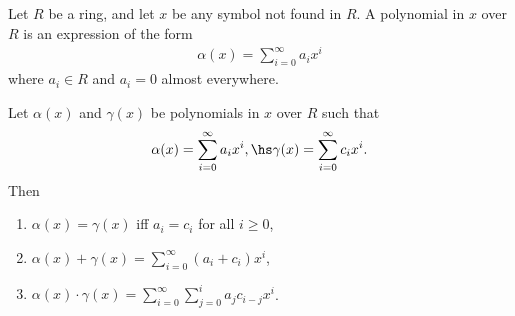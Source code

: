 \documentclass{article}
\begin{document}
\begin{definition}
    Let $R$ be a ring, and let $x$ be any symbol not found in $R$. A polynomial in $x$ over $R$ 
    is an expression of the form 
    \begin{align*}
        \alpha(x)=\sum_{i=0}^\infty a_ix^i
    \end{align*}
    where $a_i\in R$ and $a_i=0$ almost everywhere.
\end{definition}

\begin{definition}
    Let $\alpha(x)$ and $\gamma(x)$ be polynomials in $x$ over $R$ such that 
    \begin{align*}
        \alpha(x)=\sum_{i=0}^\infty a_ix^i,\hs
        \gamma(x)=\sum_{i=0}^\infty c_ix^i.
    \end{align*}
    Then \begin{enumerate}
        \item $\alpha(x)=\gamma(x)$ iff $a_i=c_i$ for all $i\geq 0$,
        \item $\alpha(x)+\gamma(x)=\sum_{i=0}^\infty (a_i+c_i)x^i$,
        \item $\alpha(x)\cdot\gamma(x)=\sum_{i=0}^\infty \sum_{j=0}^i a_jc_{i-j}x^i$.
    \end{enumerate}
\end{definition}
\end{document}
